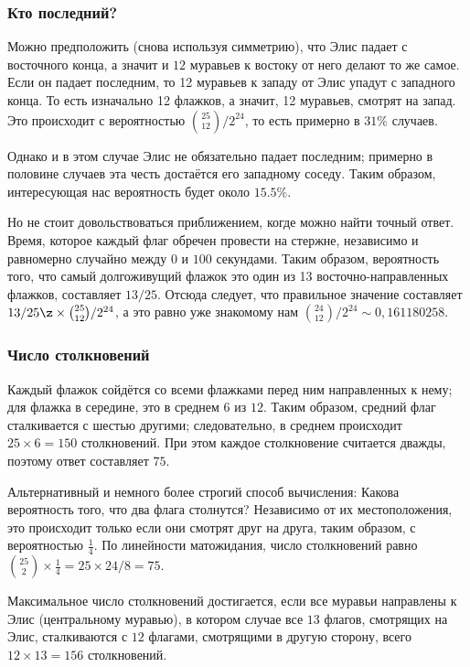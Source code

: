 \subsubsection*{Кто последний?}

Можно предположить (снова используя симметрию), что Элис падает с восточного конца,
а значит и $12$ муравьев к востоку от него делают то же самое.
Если он падает последним, то 12 муравьев к западу от Элис упадут с западного конца.
То есть изначально 12 флажков, а значит, 12 муравьев, смотрят на запад. Это происходит с вероятностью $\binom{25}{12}/2^{24}$, то есть примерно в $31\%$ случаев.

Однако и в этом случае Элис не обязательно падает последним; примерно в половине случаев эта честь достаётся его западному соседу.
Таким образом, интересующая нас вероятность будет около $15.5\%$.

Но не стоит довольствоваться приближением, когде можно найти точный ответ.
Время, которое каждый флаг обречен провести на стержне, независимо и равномерно случайно между $0$ и $100$ секундами.
Таким образом, вероятность того, что самый долгоживущий флажок это один из 13 восточно-направленных флажков, составляет $13/25$.
Отсюда следует, что правильное значение составляет $13/25 \z\times\binom{25}{12}/2^{24}$, а это равно уже знакомому нам $\binom{24}{12}/2^{24}\sim 0{,}161180258$.

\subsubsection*{Число столкновений}

Каждый флажок сойдётся со всеми флажками перед ним направленных к нему;
для флажка в середине, это в среднем $6$ из $12$.
Таким образом, средний флаг сталкивается с шестью другими; следовательно, в среднем происходит $25 \times 6 = 150$ столкновений.
При этом каждое столкновение считается дважды, поэтому ответ составляет $75$.

Альтернативный и немного более строгий способ вычисления:
Какова вероятность того, что два флага столнутся?
Независимо от их местоположения, это происходит только если они смотрят друг на друга, таким образом, с вероятностью $\tfrac14$.
По линейности матожидания, число столкновений равно $\binom{25}2 \times \tfrac14 = 25 \times 24 /8 = 75$.

Максимальное число столкновений достигается, если все муравьи направлены к Элис (центральному муравью), в котором случае все $13$ флагов, смотрящих на Элис, сталкиваются с $12$ флагами, смотрящими в другую сторону, всего $12 \times 13 = 156$ столкновений.

